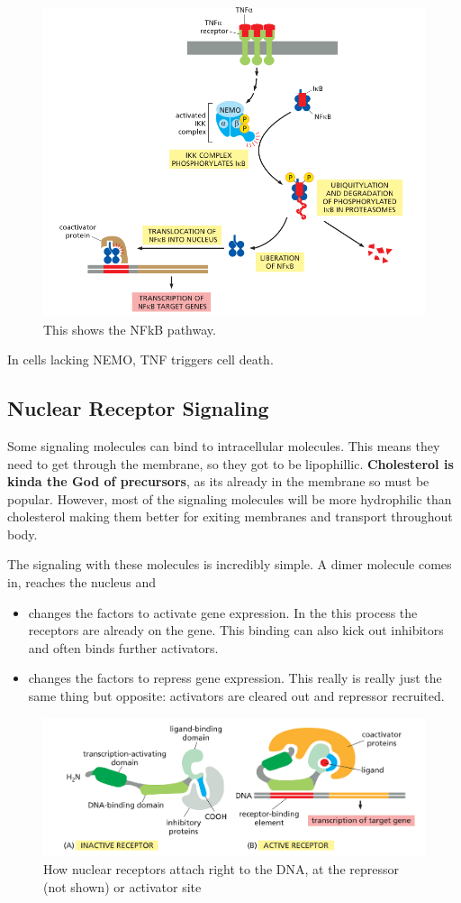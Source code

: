 \documentclass[../main.tex]{subfiles}
\begin{document}
\begin{figure}[H]
	\centering
	\includegraphics[width=0.7\linewidth]{NF_path}
	\caption{This shows the NFkB pathway.}
\end{figure}

In cells lacking NEMO, TNF triggers cell death.

\subsection{Nuclear Receptor Signaling}

Some signaling molecules can bind to intracellular molecules. This means they need to get through the membrane, so they got to be lipophillic. \textbf{\gls{Cholesterol} is kinda the God of precursors}, as its already in the membrane so must be popular. However, most of the signaling molecules will be more hydrophilic than cholesterol making them better for exiting membranes and transport throughout body.

The signaling with these molecules is incredibly simple. A dimer molecule comes in, reaches the nucleus and
\begin{itemize}
	\item changes the factors to activate gene expression. In the this process the receptors are already on the gene. This binding can also kick out inhibitors and often binds further activators.
	\item changes the factors to repress gene expression. This really is really just the same thing but opposite: activators are cleared out and repressor recruited. 
\end{itemize}

\begin{figure}[H]
	\centering
	\includegraphics[width=0.5\linewidth]{Nuc_act}
	\caption{How nuclear receptors attach right to the DNA, at the repressor (not shown) or activator site}
\end{figure}
\end{document}
